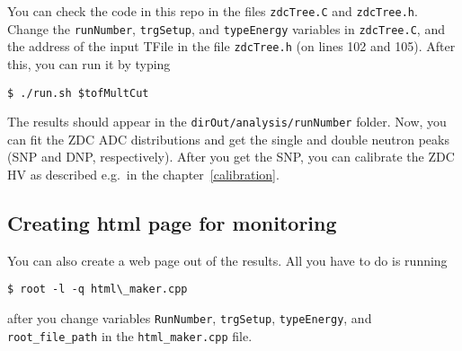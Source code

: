 You can check the code in this repo in the files
\texttt{zdcTree.C} and \texttt{zdcTree.h}. Change the \texttt{runNumber}, \texttt{trgSetup},
and \texttt{typeEnergy} variables in \texttt{zdcTree.C}, and
the address of the input TFile in the file \texttt{zdcTree.h} (on lines 102 and 105). After this, you can run it by
typing
\begin{verbatim}
$ ./run.sh $tofMultCut
\end{verbatim}
The results should appear in the \texttt{dirOut/analysis/runNumber} folder. Now, you can fit the ZDC ADC distributions
and get the single and double neutron peaks (SNP and DNP, respectively). After you get the SNP, you can calibrate
the ZDC HV as described e.g.\ in the chapter~\ref{calibration}.

\subsection{Creating html page for monitoring}\hypertarget{creating-html-page-for-monitoring}{}\label{creating-html-page-for-monitoring}

You can also create a web page out of the results. All you have to do is running
\begin{verbatim}
$ root -l -q html\_maker.cpp
\end{verbatim}
after you change variables \texttt{RunNumber}, \texttt{trgSetup}, \texttt{typeEnergy}, 
and \texttt{root\_file\_path} in the \texttt{html\_maker.cpp} file.

